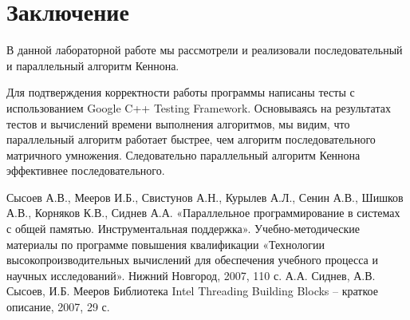 \documentclass{report}
\begin{document}
\section*{Заключение}
В данной лабораторной работе мы рассмотрели и реализовали последовательный и параллельный алгоритм Кеннона.
\par Для подтверждения корректности работы программы написаны тесты с использованием Google C++ Testing Framework. Основываясь на результатах тестов и вычислений времени выполнения алгоритмов, мы видим, что параллельный алгоритм работает быстрее, чем алгоритм последовательного матричного умножения. Следовательно параллельный алгоритм Кеннона эффективнее последовательного.
\newpage
 
\begin{thebibliography}{1}
 Сысоев А.В., Мееров И.Б., Свистунов А.Н., Курылев А.Л., Сенин А.В., Шишков А.В., Корняков К.В., Сиднев А.А. «Параллельное программирование в системах с общей памятью. Инструментальная поддержка». Учебно-методические материалы по программе повышения квалификации «Технологии высокопроизводительных вычислений для обеспечения учебного процесса и научных исследований». Нижний Новгород, 2007, 110 с.
 А.А. Сиднев, А.В. Сысоев, И.Б. Мееров Библиотека Intel Threading Building Blocks – краткое описание, 2007, 29 с.
\end{thebibliography}
\newpage

\end{document}
